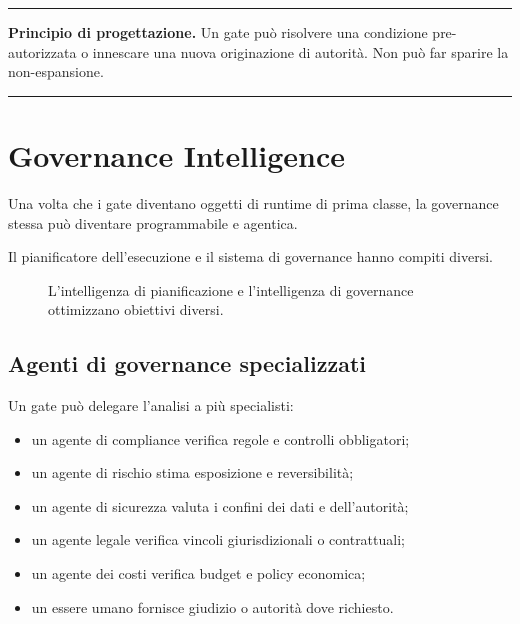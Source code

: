 \documentclass[10pt,oneside,openany]{book}
\newcommand{\principle}[1]{%
  \vspace{4pt}
  \noindent\begin{minipage}{\linewidth}
  \hrule\vspace{5pt}
  \small\sffamily\raggedright\textbf{Principio di progettazione.} #1
  \vspace{5pt}\hrule
  \end{minipage}\vspace{4pt}
}
\begin{document}
\principle{Un gate può risolvere una condizione pre-autorizzata o innescare una nuova originazione di autorità. Non può far sparire la non-espansione.}

\chapter{Governance Intelligence}

Una volta che i gate diventano oggetti di runtime di prima classe, la governance stessa può diventare programmabile e agentica.

Il pianificatore dell'esecuzione e il sistema di governance hanno compiti diversi.

\begin{figure}[ht]
\centering
{}
\caption{L'intelligenza di pianificazione e l'intelligenza di governance ottimizzano obiettivi diversi.}
\end{figure}

\section{Agenti di governance specializzati}
Un gate può delegare l'analisi a più specialisti:

\begin{itemize}
\item un agente di compliance verifica regole e controlli obbligatori;
\item un agente di rischio stima esposizione e reversibilità;
\item un agente di sicurezza valuta i confini dei dati e dell'autorità;
\item un agente legale verifica vincoli giurisdizionali o contrattuali;
\item un agente dei costi verifica budget e policy economica;
\item un essere umano fornisce giudizio o autorità dove richiesto.
\end{itemize}
\end{document}
